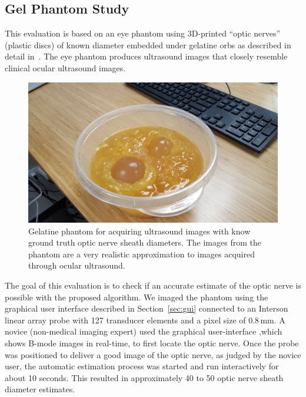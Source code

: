 \documentclass{llncs}
\begin{document}
\subsection{Gel Phantom Study}
\label{sec:groundtruth}
This evaluation is based on an eye phantom using 3D-printed “optic nerves”
(plastic discs) of known diameter embedded under gelatine orbs as described in
detail in~\cite{Ze2014}. The eye phantom produces ultrasound images that closely
resemble clinical ocular ultrasound images.
\begin{figure}
\centering
\includegraphics[width=0.7\linewidth]{phantom.jpg} 
\caption{
\label{fig:phantom}
Gelatine phantom for acquiring ultrasound images with know ground truth optic
nerve sheath diameters. The images from the phantom are a very realistic
approximation to images acquired through ocular ultrasound. 
}
\end{figure}

The goal of this evaluation is to check if an accurate estimate of the optic
nerve is possible with the proposed algorithm. We imaged the phantom using the
graphical user interface described in Section~\ref{sec:gui} connected to an
Interson linear array probe with 127 transducer elements and a pixel size of
0.8\,mm. A novice (non-medical imaging expert) used the graphical user-interface
,which shows B-mode images in real-time, to first locate the optic nerve. Once
the probe was positioned to deliver a good image of the optic nerve, as judged
by the novice user, the automatic estimation process was started and run
interactively for about 10 seconds. This resulted in approximately 40 to 50
optic nerve sheath diameter estimates. 
\end{document}
